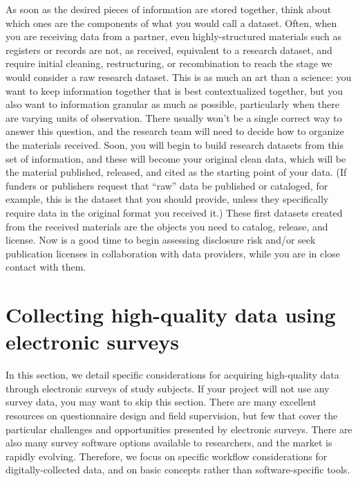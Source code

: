 \documentclass[
]{book}
\begin{document}
As soon as the desired pieces of information are stored together,
think about which ones are the components of what you would call a dataset.
Often, when you are receiving data from a partner,
even highly-structured materials such as registers or records
are not, as received, equivalent to a research dataset,
and require initial cleaning, restructuring, or recombination
to reach the stage we would consider a raw research dataset.
This is as much an art than a science:
you want to keep information together that is best contextualized together,
but you also want to information granular as much as possible,
particularly when there are varying units of observation.
There usually won't be a single correct way to answer this question,
and the research team will need to decide how to organize the materials received.
Soon, you will begin to build research datasets from this set of information,
and these will become your original clean data,
which will be the material published, released, and cited
as the starting point of your data.
(If funders or publishers request that ``raw'' data be published or cataloged,
for example, this is the dataset that you should provide,
unless they specifically require data in the original format you received it.)
These first datasets created from the received materials
are the objects you need to catalog, release, and license.
Now is a good time to begin assessing disclosure risk
and/or seek publication licenses in collaboration with data providers,
while you are in close contact with them.

\hypertarget{collecting-high-quality-data-using-electronic-surveys}{%
\section*{Collecting high-quality data using electronic surveys}\label{collecting-high-quality-data-using-electronic-surveys}}

In this section, we detail specific considerations
for acquiring high-quality data through electronic surveys of study subjects.
If your project will not use any survey data, you may want to skip this section.
There are many excellent resources on questionnaire design and field supervision,
but few that cover the particular challenges and opportunities presented by electronic surveys.
There are also many survey software options available to researchers,
and the market is rapidly evolving.
Therefore, we focus on specific workflow considerations for digitally-collected data,
and on basic concepts rather than software-specific tools.
\end{document}
